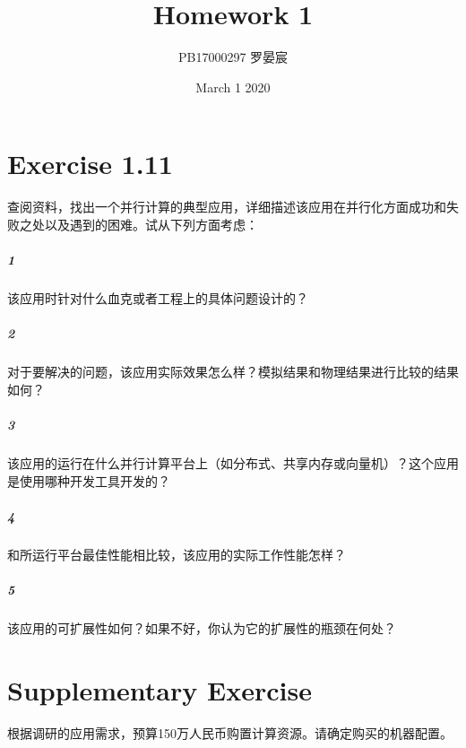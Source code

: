 \documentclass{article}
\title{Homework 1}
\author{PB17000297 罗晏宸}
\date{March 1 2020}
\begin{document}
\maketitle

\section{Exercise 1.11}
查阅资料，找出一个并行计算的典型应用，详细描述该应用在并行化方面成功和失败之处以及遇到的困难。试从下列方面考虑：
\subparagraph{1}该应用时针对什么血克或者工程上的具体问题设计的？
\subparagraph{2}对于要解决的问题，该应用实际效果怎么样？模拟结果和物理结果进行比较的结果如何？
\subparagraph{3}该应用的运行在什么并行计算平台上（如分布式、共享内存或向量机）？这个应用是使用哪种开发工具开发的？
\subparagraph{4}和所运行平台最佳性能相比较，该应用的实际工作性能怎样？
\subparagraph{5}该应用的可扩展性如何？如果不好，你认为它的扩展性的瓶颈在何处？



\section{Supplementary Exercise}
根据调研的应用需求，预算150万人民币购置计算资源。请确定购买的机器配置。
\end{document}
